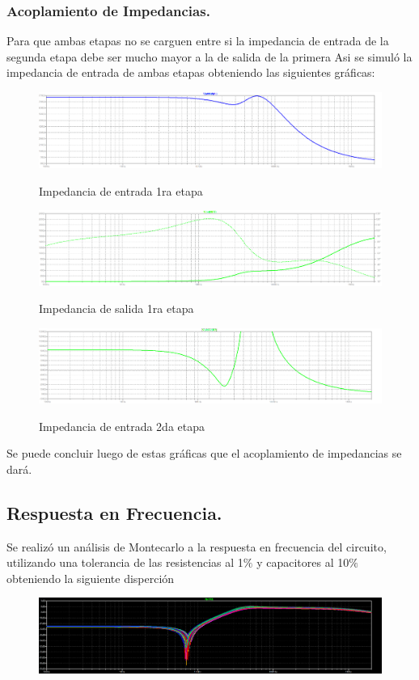 \subsubsection{Acoplamiento de Impedancias.}
Para que ambas etapas no se carguen entre si la impedancia de entrada de la segunda etapa debe ser mucho mayor a la de salida de la primera
Asi se simuló la impedancia de entrada de ambas etapas obteniendo las siguientes gráficas:
\begin{figure}[H]
	\centering
	\includegraphics[width=\textwidth]{Imagenes-Ej3/ZinE1.png}
	\label{fig:stepresponse}
	\caption{Impedancia de entrada 1ra etapa}
\end{figure}

\begin{figure}[H]
	\centering
	\includegraphics[width=\textwidth]{Imagenes-Ej3/ZoutE1.png}
	\label{fig:stepresponse}
	\caption{Impedancia de salida 1ra etapa}
\end{figure}

\begin{figure}[H]
	\centering
	\includegraphics[width=\textwidth]{Imagenes-Ej3/ZinE2.png}
	\label{fig:stepresponse}
	\caption{Impedancia de entrada 2da etapa}
\end{figure}
Se puede concluir luego de estas gráficas que el acoplamiento de impedancias se dará.
\subsection{Respuesta en Frecuencia.}
Se realizó un análisis de Montecarlo a la respuesta en frecuencia del circuito, utilizando una tolerancia de las resistencias al 1$\%$ y capacitores al 10$\%$ obteniendo la siguiente disperción
\begin{figure}[H]
	\centering
	\includegraphics[width=\textwidth]{Imagenes-Ej3/mcsedra.png}
	\label{fig:mcsedra}
\end{figure}


